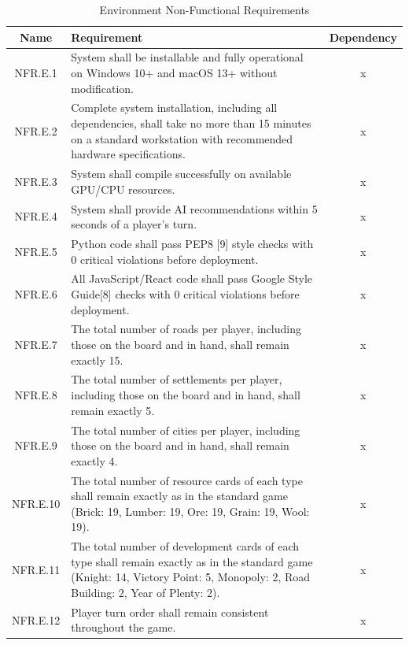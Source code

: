 \documentclass{article}
\begin{document}
\begin{table}[h!]
    \centering
    \begin{tabular}{|c|p{10cm}|c|}
    \hline
    \textbf{Name} & \textbf{Requirement} & \textbf{Dependency} \\
    \hline
    NFR.E.1 & System shall be installable and fully operational on Windows 10+ and macOS 13+ without modification. & x \\
    \hline
    NFR.E.2 & Complete system installation, including all dependencies, shall take no more than 15 minutes on a standard workstation with recommended hardware specifications. & x \\
    \hline
    NFR.E.3 & System shall compile successfully on available GPU/CPU resources. & x \\
    \hline
    NFR.E.4 & System shall provide AI recommendations within 5 seconds of a player’s turn. & x \\
    \hline
    NFR.E.5 & Python code shall pass PEP8 [9] style checks with 0 critical violations before deployment. & x \\
    \hline
    NFR.E.6 & All JavaScript/React code shall pass Google Style Guide[8] checks with 0 critical violations before deployment. & x \\
    \hline
    NFR.E.7 & The total number of roads per player, including those on the board and in hand, shall remain exactly 15. & x \\
    \hline
    NFR.E.8 & The total number of settlements per player, including those on the board and in hand, shall remain exactly 5. & x \\
    \hline
    NFR.E.9 & The total number of cities per player, including those on the board and in hand, shall remain exactly 4. & x \\
    \hline
    NFR.E.10 & The total number of resource cards of each type shall remain exactly as in the standard game (Brick: 19, Lumber: 19, Ore: 19, Grain: 19, Wool: 19). & x \\
    \hline
    NFR.E.11 & The total number of development cards of each type shall remain exactly as in the standard game (Knight: 14, Victory Point: 5, Monopoly: 2, Road Building: 2, Year of Plenty: 2). & x \\
    \hline
    NFR.E.12 & Player turn order shall remain consistent throughout the game. & x \\
    \hline
    \end{tabular}
    \caption{Environment Non-Functional Requirements }
    \label{tab:nfr}
\end{table}
\end{document}
